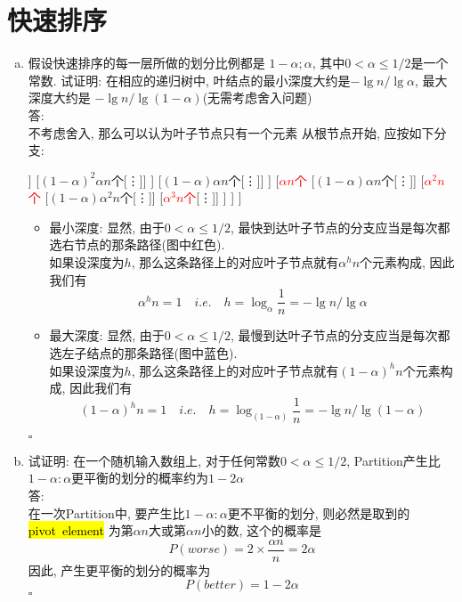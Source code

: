 \documentclass[UTF8]{article}
\newcommand{\hlg}[1]{
	\begingroup
		\sethlcolor{lgray}%
		\textcolor{black}{\hl{\mbox{#1}}}%
	\endgroup
}
\begin{document}
\section{快速排序}
\begin{enumerate}[(a). ]
\item 假设快速排序的每一层所做的划分比例都是 $1-\alpha ; \alpha$, 其中$0<\alpha\le1/2$是一个常数. 试证明: 在相应的递归树中, 叶结点的最小深度大约是$-\lg n/\lg \alpha$, 最大深度大约是 $-\lg n/\lg(1-\alpha)$(无需考虑舍入问题)\\
答:\\
不考虑舍入, 那么可以认为叶子节点只有一个元素
从根节点开始, 应按如下分支:
\begin{center}
\begin{forest}
	[$n$个
		[\textcolor{blue}{$(1-\alpha)n$个}
			[\textcolor{blue}{$(1-\alpha)^2n$个}
				[\textcolor{blue}{$(1-\alpha)^3 n$个}[\vdots]]
				[$(1-\alpha)^2\alpha n$个[\vdots]]
			]
			[$(1-\alpha)\alpha n$个[\vdots]]
		]
		[\textcolor{red}{$\alpha n$个}
			[$(1-\alpha)\alpha n$个[\vdots]]
			[\textcolor{red}{$\alpha^2 n$个}
				[$(1-\alpha)\alpha^2 n$个[\vdots]]
				[\textcolor{red}{$\alpha^3 n$个}[\vdots]]
			]
		]
	]
\end{forest}
\end{center}
\begin{itemize}
\item 最小深度: 显然, 由于$0<\alpha\le1/2$, 最快到达叶子节点的分支应当是每次都选右节点的那条路径(图中红色).\\
如果设深度为$h$, 那么这条路径上的对应叶子节点就有$\alpha^h n$个元素构成, 因此我们有
$$\alpha^h n=1\quad i.e.\quad h=\log_{\alpha}{\frac{1}{n}}=-\lg n/\lg\alpha$$
\item 最大深度: 显然, 由于$0<\alpha\le1/2$, 最慢到达叶子节点的分支应当是每次都选左子结点的那条路径(图中蓝色).\\
如果设深度为$h$, 那么这条路径上的对应叶子节点就有$(1-\alpha)^h n$个元素构成, 因此我们有
$$(1-\alpha)^h n=1\quad i.e.\quad h=\log_{(1-\alpha)}{\frac{1}{n}}=-\lg n/\lg(1-\alpha)$$
\end{itemize}
\hfill$\square$

\item 试证明: 在一个随机输入数组上, 对于任何常数$0<\alpha\le1/2$, {\sc Partition}产生比$1-\alpha:\alpha$更平衡的划分的概率约为$1-2\alpha$\\
答:\\
在一次{\sc Partition}中, 要产生比$1-\alpha:\alpha$更不平衡的划分, 则必然是取到的\hlg{pivot element}为第$\alpha n$大或第$\alpha n$小的数, 这个的概率是
$$P(worse) = 2\times \frac{\alpha n}{n}=2\alpha$$
因此, 产生更平衡的划分的概率为
$$P(better)=1-2\alpha$$
\hfill$\square$

\end{enumerate}
\end{document}
